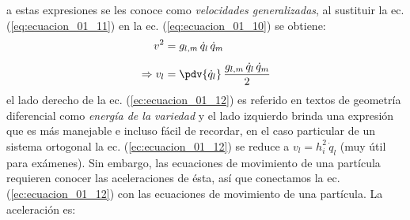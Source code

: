 a estas expresiones se les conoce como \emph{velocidades generalizadas}, al sustituir la ec. (\ref{eq:ecuacion_01_11}) en la ec. (\ref{eq:ecuacion_01_10}) se obtiene:
\begin{align}
\begin{aligned}[b]
\end{aligned}
v^{2} &= g_{l,m} \, \dot{q}_{l} \, \dot{q}_{m} \\[0.5em]
\Rightarrow v_{l} &= \pdv{\dot{q}_{l}} \, \dfrac{g_{l,m} \, \dot{q}_{l} \, \dot{q}_{m}}{2}
\label{ec:ecuacion_01_12}
\end{align}
el lado derecho de la ec. (\ref{ec:ecuacion_01_12}) es referido en textos de geometría diferencial como \emph{energía de la variedad} y el lado izquierdo brinda una expresión que es más manejable e incluso fácil de recordar, en el caso particular de un sistema ortogonal la ec. (\ref{ec:ecuacion_01_12}) se reduce a $v_{l} = h_{i}^{2} \, \dot{q}_{l}$ (muy útil para exámenes). Sin embargo, las ecuaciones de movimiento de una partícula requieren conocer las aceleraciones de ésta, así que conectamos la ec. (\ref{ec:ecuacion_01_12}) con las ecuaciones de movimiento de una partícula. La aceleración es:









